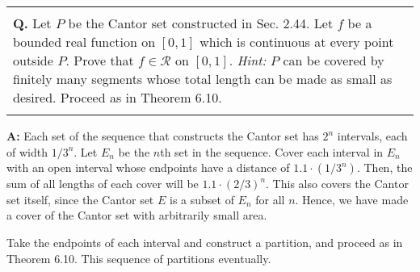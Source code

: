 \documentclass{article}
\newenvironment{myboxed}{\noindent\begin{tabular}{|p{.975\linewidth}|}\hline \\}{\\\\\hline\end{tabular}}
\newcounter{Question}
\newenvironment{Question} 
{\bigskip\begin{myboxed}\refstepcounter{Question}\par\noindent\textbf{Q\theQuestion.}}
{\end{myboxed}\bigskip}
\newenvironment{Answer} {\par\noindent\textbf{A:}} {}
\begin{document}
\begin{Question}
    Let $P$ be the Cantor set constructed in Sec. 2.44. Let $f$ be a bounded real function on $[0, 1]$ which is continuous at every point outside $P$. Prove that $f \in \mathscr{R}$ on $[0,1]$. \textit{Hint:} $P$ can be covered by finitely many segments whose total length can be made as small as desired. Proceed as in Theorem 6.10.
\end{Question}
\begin{Answer}
    Each set of the sequence that constructs the Cantor set has $2^n$ intervals, each of width $1/3^n$. Let $E_n$ be the $n$th set in the sequence. Cover each interval in $E_n$ with an open interval whose endpoints have a distance of $1.1\cdot(1/3^n)$. Then, the sum of all lengths of each cover will be $1.1 \cdot (2/3)^n$. This also covers the Cantor set itself, since the Cantor set $E$ is a subset of $E_n$ for all $n$. Hence, we have made a cover of the Cantor set with arbitrarily small area.

    Take the endpoints of each interval and construct a partition, and proceed as in Theorem 6.10. 
    This sequence of partitions eventually.
\end{Answer}
\end{document}
